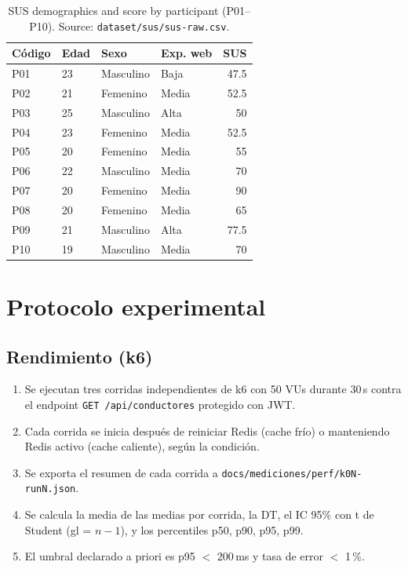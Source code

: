 \begin{table}[htbp]
\caption{SUS demographics and score by participant (P01--P10). Source: \texttt{dataset/sus/sus-raw.csv}.}
\label{tab:sus-demografia}
\small
\begin{tabular}{@{}llllr@{}}
\toprule
\textbf{Código} & \textbf{Edad} & \textbf{Sexo} & \textbf{Exp. web} & \textbf{SUS} \\
\midrule
P01 & 23 & Masculino & Baja & 47.5 \\
P02 & 21 & Femenino & Media & 52.5 \\
P03 & 25 & Masculino & Alta & 50 \\
P04 & 23 & Femenino & Media & 52.5 \\
P05 & 20 & Femenino & Media & 55 \\
P06 & 22 & Masculino & Media & 70 \\
P07 & 20 & Femenino & Media & 90 \\
P08 & 20 & Femenino & Media & 65 \\
P09 & 21 & Masculino & Alta & 77.5 \\
P10 & 19 & Masculino & Media & 70 \\
\bottomrule
\end{tabular}
\end{table}

\section{Protocolo experimental}
\label{sec:protocolo}

\subsection{Rendimiento (k6)}

\begin{enumerate}
  \item Se ejecutan tres corridas independientes de k6 con 50 VUs durante 30\,s contra el endpoint \texttt{GET /api/conductores} protegido con JWT.
  \item Cada corrida se inicia después de reiniciar Redis (cache frío) o manteniendo Redis activo (cache caliente), según la condición.
  \item Se exporta el resumen de cada corrida a \texttt{docs/mediciones/perf/k0N-runN.json}.
  \item Se calcula la media de las medias por corrida, la DT, el IC 95\% con t de Student (gl = $n - 1$), y los percentiles p50, p90, p95, p99.
  \item El umbral declarado a priori es p95 $<$ 200\,ms y tasa de error $<$ 1\,\%.
\end{enumerate}

